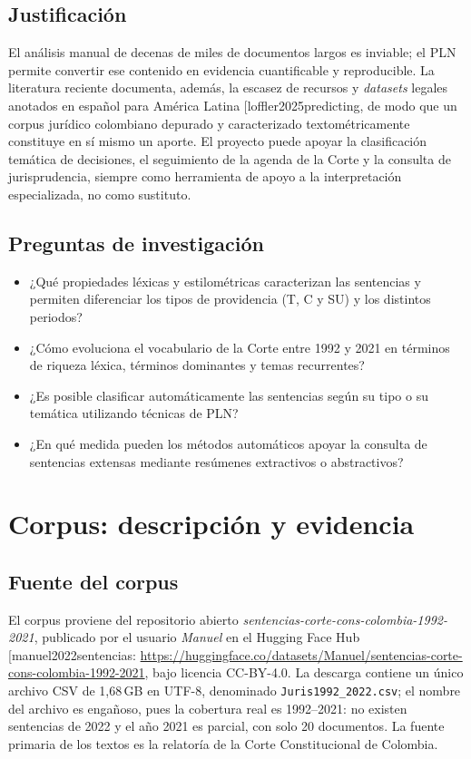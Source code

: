 \documentclass[11pt]{tg_usta}
\makeatletter
\renewcommand{\cite}{\@ifnextchar[{\@tempswatrue\@citex}{\@tempswafalse\@citex[]}}
\makeatother
\begin{document}
\subsection{Justificación}
El análisis manual de decenas de miles de documentos largos es inviable; el PLN permite convertir ese contenido en evidencia cuantificable y reproducible. La literatura reciente documenta, además, la escasez de recursos y \emph{datasets} legales anotados en español para América Latina \cite{loffler2025predicting}, de modo que un corpus jurídico colombiano depurado y caracterizado textométricamente constituye en sí mismo un aporte. El proyecto puede apoyar la clasificación temática de decisiones, el seguimiento de la agenda de la Corte y la consulta de jurisprudencia, siempre como herramienta de apoyo a la interpretación especializada, no como sustituto.

\subsection{Preguntas de investigación}
\begin{itemize}
  \item ¿Qué propiedades léxicas y estilométricas caracterizan las sentencias y permiten diferenciar los tipos de providencia (T, C y SU) y los distintos periodos?
  \item ¿Cómo evoluciona el vocabulario de la Corte entre 1992 y 2021 en términos de riqueza léxica, términos dominantes y temas recurrentes?
  \item ¿Es posible clasificar automáticamente las sentencias según su tipo o su temática utilizando técnicas de PLN?
  \item ¿En qué medida pueden los métodos automáticos apoyar la consulta de sentencias extensas mediante resúmenes extractivos o abstractivos?
\end{itemize}

\section{Corpus: descripción y evidencia}

\subsection{Fuente del corpus}
El corpus proviene del repositorio abierto \emph{sentencias-corte-cons-colombia-1992-2021}, publicado por el usuario \emph{Manuel} en el Hugging Face Hub \cite{manuel2022sentencias}: \url{https://huggingface.co/datasets/Manuel/sentencias-corte-cons-colombia-1992-2021}, bajo licencia CC-BY-4.0. La descarga contiene un único archivo CSV de 1,68\,GB en UTF-8, denominado \texttt{Juris1992\_2022.csv}; el nombre del archivo es engañoso, pues la cobertura real es 1992--2021: no existen sentencias de 2022 y el año 2021 es parcial, con solo 20 documentos. La fuente primaria de los textos es la relatoría de la Corte Constitucional de Colombia.
\end{document}
